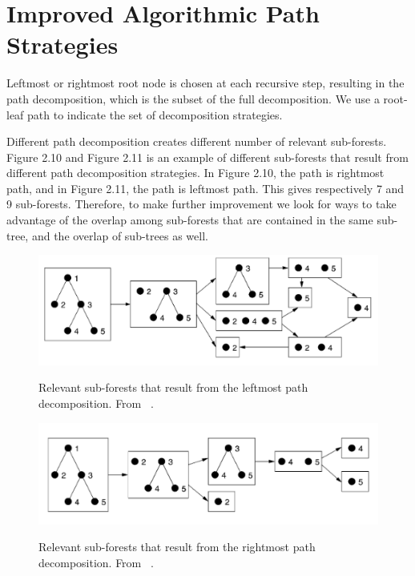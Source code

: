 \section{Improved Algorithmic Path Strategies}
Leftmost or rightmost root node is chosen at each recursive step, resulting in the path decomposition, which is the subset of the full decomposition. We use a root-leaf path to indicate the set of decomposition strategies.

Different path decomposition creates different number of relevant sub-forests. Figure 2.10 and Figure 2.11 is an example of different sub-forests that result from different path decomposition strategies. In Figure 2.10, the path is rightmost path, and in Figure 2.11, the path is leftmost path. This gives respectively 7 and 9 sub-forests. Therefore, to make further improvement we look for ways to take advantage of the overlap among sub-forests that are contained in the same sub-tree, and the overlap of sub-trees as well. 

\begin{figure}
		\centering
		\includegraphics[width=12cm,clip]{Figures/LeftmostPathDecomposition}
		\label{Relevant Sub-forests that Result From the Leftmost Path Decomposition} 
		\caption{Relevant sub-forests that result from the leftmost path decomposition. From ~\cite{dulucq2005decomposition}.}
\end{figure}

\begin{figure}
		\centering
		\includegraphics[width=12cm,clip]{Figures/RightmostPathDecomposition}
		\label{Relevant Sub-forests that Result From the Rightmost Path Decomposition} 
		\caption{Relevant sub-forests that result from the rightmost path decomposition. From ~\cite{dulucq2005decomposition}.}
\end{figure}

